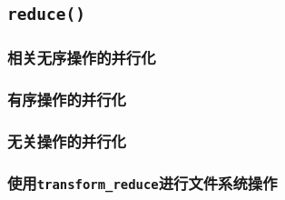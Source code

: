\subsection{\texttt{reduce()}}

\subsubsection{相关无序操作的并行化}

\subsubsection{有序操作的并行化}

\subsubsection{无关操作的并行化}

\subsubsection{使用\texttt{transform\_reduce}进行文件系统操作}\label{ch22.6.1.4}
